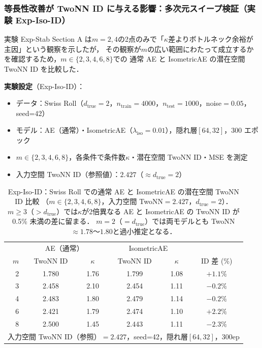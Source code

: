\documentclass[11pt,a4paper]{jsarticle}
\newcommand{\kap}{\kappa}
\begin{document}
\subsubsection{等長性改善が TwoNN ID に与える影響：多次元スイープ検証（実験 Exp-Iso-ID）}\label{sec:exp_iso_id}

実験 Exp-Stab Section A は$m=2,4$の2点のみで「$\kap$差よりボトルネック余裕が主因」という観察を示したが，
その観察が$m$の広い範囲にわたって成立するかを確認するため，$m \in \{2,3,4,6,8\}$での
通常 AE と IsometricAE の潜在空間 TwoNN ID を比較した．

\textbf{実験設定}（Exp-Iso-ID）：
\begin{itemize}
  \item データ：Swiss Roll（$d_\mathrm{true}=2$，$n_\mathrm{train}=4000$，$n_\mathrm{test}=1000$，noise$=0.05$，seed=42）
  \item モデル：AE（通常）・IsometricAE（$\lambda_\mathrm{iso}=0.01$），隠れ層$[64,32]$，300 エポック
  \item $m \in \{2,3,4,6,8\}$，各条件で条件数$\kap$・潜在空間 TwoNN ID・MSE を測定
  \item 入力空間 TwoNN ID（参照値）：$2.427$（$\approx d_\mathrm{true}=2$）
\end{itemize}

\begin{table}[H]
\centering
\caption{Exp-Iso-ID：Swiss Roll での通常 AE と IsometricAE の潜在空間 TwoNN ID 比較
（$m \in \{2,3,4,6,8\}$，入力空間 TwoNN$=2.427$，$d_\mathrm{true}=2$）．
$m \geq 3$（$>d_\mathrm{true}$）では$\kap$が2倍異なる AE と IsometricAE の TwoNN ID が 0.5\% 未満の差に留まる．
$m=2$（$=d_\mathrm{true}$）では両モデルとも TwoNN$\approx 1.78$〜$1.80$と過小推定となる．}
\label{tab:iso_id}
\small
\begin{tabular}{r cc | cc | c}
\toprule
 & \multicolumn{2}{c|}{AE（通常）} & \multicolumn{2}{c|}{IsometricAE} & \\
$m$ & TwoNN ID & $\kap$ & TwoNN ID & $\kap$ & ID 差 (\%) \\
\midrule
2 & 1.780 & 1.76 & 1.799 & 1.08 & $+1.1\%$ \\
3 & 2.458 & 2.10 & 2.454 & 1.11 & $-0.2\%$ \\
4 & 2.483 & 1.80 & 2.479 & 1.14 & $-0.2\%$ \\
6 & 2.421 & 1.79 & 2.474 & 1.10 & $+2.2\%$ \\
8 & 2.500 & 1.45 & 2.443 & 1.11 & $-2.3\%$ \\
\midrule
\multicolumn{6}{l}{入力空間 TwoNN ID（参照）$= 2.427$，seed=42，隠れ層$[64,32]$，300ep} \\
\bottomrule
\end{tabular}
\end{table}
\end{document}
